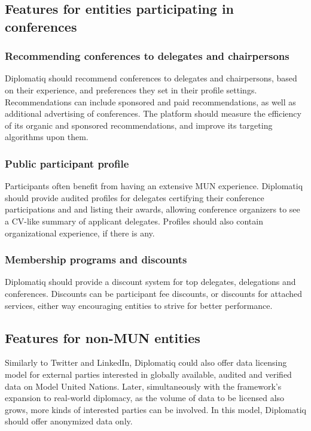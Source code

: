 \subsection{Features for entities participating in conferences}

\subsubsection{Recommending conferences to delegates and chairpersons}

Diplomatiq should recommend conferences to delegates and chairpersons, based on their experience, and preferences they set in their profile settings. Recommendations can include sponsored and paid recommendations, as well as additional advertising of conferences. The platform should measure the efficiency of its organic and sponsored recommendations, and improve its targeting algorithms upon them.

\subsubsection{Public participant profile}

Participants often benefit from having an extensive MUN experience. Diplomatiq should provide audited profiles for delegates certifying their conference participations and and listing their awards, allowing conference organizers to see a CV-like summary of applicant delegates. Profiles should also contain organizational experience, if there is any.

\subsubsection{Membership programs and discounts}

Diplomatiq should provide a discount system for top delegates, delegations and conferences. Discounts can be participant fee discounts, or discounts for attached services, either way encouraging entities to strive for better performance.

\subsection{Features for non-MUN entities}

Similarly to Twitter and LinkedIn, Diplomatiq could also offer data licensing model for external parties interested in globally available, audited and verified data on Model United Nations. Later, simultaneously with the framework's expansion to real-world diplomacy, as the volume of data to be licensed also grows, more kinds of interested parties can be involved. In this model, Diplomatiq should offer anonymized data only.

